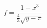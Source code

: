 \documentclass[a4paper,10pt]{minimal}
\begin{document}
\[ f =  \frac{1-x^{3}}{\frac{4}{3} \sqrt{y -  \pi }} \]
\end{document}
